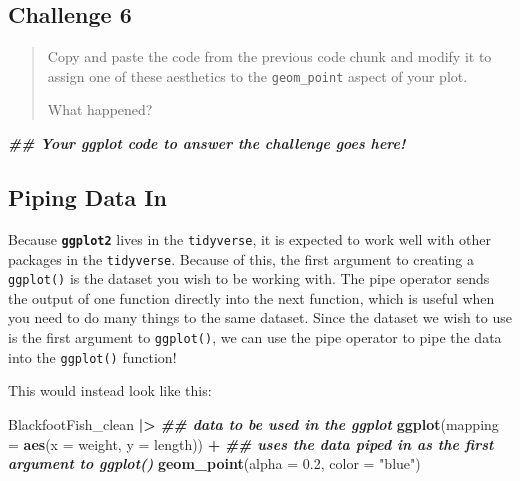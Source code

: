 \documentclass[
  10pt,
  letterpaper,
  twoside,
  openright]{book}
\newenvironment{Shaded}{\begin{snugshade}}{\end{snugshade}}
\newcommand{\AttributeTok}[1]{\textcolor[rgb]{0.13,0.29,0.53}{#1}}
\newcommand{\DocumentationTok}[1]{\textcolor[rgb]{0.56,0.35,0.01}{\textbf{\textit{#1}}}}
\newcommand{\FloatTok}[1]{\textcolor[rgb]{0.00,0.00,0.81}{#1}}
\newcommand{\FunctionTok}[1]{\textcolor[rgb]{0.13,0.29,0.53}{\textbf{#1}}}
\newcommand{\NormalTok}[1]{#1}
\newcommand{\SpecialCharTok}[1]{\textcolor[rgb]{0.81,0.36,0.00}{\textbf{#1}}}
\newcommand{\StringTok}[1]{\textcolor[rgb]{0.31,0.60,0.02}{#1}}
\begin{document}
\hypertarget{challenge-6}{%
\subsection{Challenge 6}\label{challenge-6}}

\begin{quote}
Copy and paste the code from the previous code chunk and modify it to
assign one of these aesthetics to the \texttt{geom\_point} aspect of
your plot.

What happened?
\end{quote}

\begin{Shaded}
\begin{Highlighting}[]
\DocumentationTok{\#\# Your ggplot code to answer the challenge goes here!}
\end{Highlighting}
\end{Shaded}

\hypertarget{piping-data-in-1}{%
\subsection{Piping Data In}\label{piping-data-in-1}}

Because \textbf{\texttt{ggplot2}} lives in the \texttt{tidyverse}, it is
expected to work well with other packages in the \texttt{tidyverse}.
Because of this, the first argument to creating a \texttt{ggplot()} is
the dataset you wish to be working with. The pipe operator sends the
output of one function directly into the next function, which is useful
when you need to do many things to the same dataset. Since the dataset
we wish to use is the first argument to \texttt{ggplot()}, we can use
the pipe operator to pipe the data into the \texttt{ggplot()} function!

This would instead look like this:

\begin{Shaded}
\begin{Highlighting}[]
\NormalTok{BlackfootFish\_clean }\SpecialCharTok{|\textgreater{}}  
  \DocumentationTok{\#\# data to be used in the ggplot  }
  \FunctionTok{ggplot}\NormalTok{(}\AttributeTok{mapping =} \FunctionTok{aes}\NormalTok{(}\AttributeTok{x =}\NormalTok{ weight, }\AttributeTok{y =}\NormalTok{ length)) }\SpecialCharTok{+} 
  \DocumentationTok{\#\# uses the data piped in as the first argument to ggplot() }
    \FunctionTok{geom\_point}\NormalTok{(}\AttributeTok{alpha =} \FloatTok{0.2}\NormalTok{, }\AttributeTok{color =} \StringTok{"blue"}\NormalTok{)}
\end{Highlighting}
\end{Shaded}
\end{document}
